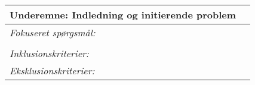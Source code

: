 \begin{table}[H]
\begin{tabular}{|ll|}
\rowcolor[HTML]{C0C0C0} 
{\color[HTML]{000000} \textbf{Underemne: Indledning og initierende problem}}       & {\color[HTML]{000000} }                              \\ \hline
\textit{Fokuseret spørgsmål:}                                                      &                                                      \\
                                                                                   &                                                      \\
\textit{Inklusionskriterier:}                                                      &                                                      \\
\textit{Eksklusionskriterier:}                                                     &                                                      \\ \hline
\end{tabular}
\end{table}